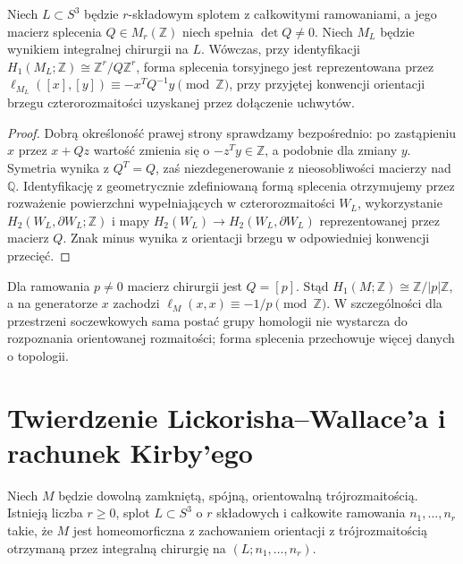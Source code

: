 \begin{twierdzenie}
Niech $L\subset S^3$ będzie $r$-składowym splotem z
całkowitymi ramowaniami, a jego macierz splecenia
$Q\in M_r(\mathbb Z)$ niech spełnia $\det Q\ne0$.
Niech $M_L$ będzie wynikiem integralnej chirurgii na $L$.
Wówczas, przy identyfikacji
$H_1(M_L;\mathbb Z)\cong\mathbb Z^r/Q\mathbb Z^r$,
forma splecenia torsyjnego jest reprezentowana przez
$\ell_{M_L}([x],[y])\equiv -x^TQ^{-1}y\pmod{\mathbb Z}$,
przy przyjętej konwencji orientacji brzegu czterorozmaitości
uzyskanej przez dołączenie uchwytów.
\end{twierdzenie}

\begin{proof}
Dobrą określoność prawej strony sprawdzamy bezpośrednio:
po zastąpieniu $x$ przez $x+Qz$ wartość zmienia się
o $-z^Ty\in\mathbb Z$, a podobnie dla zmiany $y$.
Symetria wynika z $Q^T=Q$, zaś niezdegenerowanie
z nieosobliwości macierzy nad $\mathbb Q$.
Identyfikację z geometrycznie zdefiniowaną formą splecenia
otrzymujemy przez rozważenie powierzchni wypełniających
w czterorozmaitości $W_L$, wykorzystanie
$H_2(W_L,\partial W_L;\mathbb Z)$ i mapy
$H_2(W_L)\to H_2(W_L,\partial W_L)$ reprezentowanej
przez macierz $Q$. Znak minus wynika z orientacji
brzegu w odpowiedniej konwencji przecięć.
\end{proof}

\begin{przyklad}
Dla ramowania $p\ne0$ macierz chirurgii jest $Q=[p]$.
Stąd $H_1(M;\mathbb Z)\cong\mathbb Z/|p|\mathbb Z$,
a na generatorze $x$ zachodzi
$\ell_M(x,x)\equiv-1/p\pmod{\mathbb Z}$.
W szczególności dla przestrzeni soczewkowych sama
postać grupy homologii nie wystarcza do rozpoznania
orientowanej rozmaitości; forma splecenia przechowuje
więcej danych o topologii.
\end{przyklad}


\section{Twierdzenie Lickorisha--Wallace'a i rachunek Kirby'ego}
\label{sec:kt-wallace}

\begin{twierdzenie}
Niech $M$ będzie dowolną zamkniętą, spójną, orientowalną
trójrozmaitością. Istnieją liczba $r\geq0$, splot
$L\subset S^3$ o $r$ składowych i całkowite ramowania
$n_1,\dots,n_r$ takie, że $M$ jest homeomorficzna z zachowaniem orientacji
z trójrozmaitością otrzymaną przez integralną chirurgię
na $(L;n_1,\dots,n_r)$.
\end{twierdzenie}

